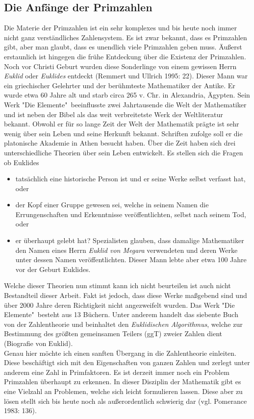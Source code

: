 \documentclass[german,12pt,a4paper]{article}
\begin{document}
\subsection{Die Anfänge der Primzahlen}
Die Materie der Primzahlen ist ein sehr komplexes und bis heute noch immer nicht ganz verständliches Zahlensystem. Es ist zwar bekannt, dass es Primzahlen gibt, aber man glaubt, dass es unendlich viele Primzahlen geben muss. Äußerst erstaunlich ist hingegen die frühe Entdeckung über die Existenz der Primzahlen. Noch vor Christi Geburt wurden diese Sonderlinge von einem gewissen Herrn \textit{Euklid} oder \textit{Euklides} entdeckt (Remmert und Ullrich 1995: 22). Dieser Mann war ein griechischer Gelehrter und der berühmteste Mathematiker der Antike. Er wurde etwa 60 Jahre alt und starb circa 265 v. Chr. in Alexandria, Ägypten. Sein Werk "Die Elemente"\ beeinflusste zwei Jahrtausende die Welt der Mathematiker und ist neben der Bibel als das weit verbreitetste Werk der Weltliteratur bekannt. Obwohl er für so lange Zeit der Welt der Mathematik prägte ist sehr wenig über sein Leben und seine Herkunft bekannt. Schriften zufolge soll er die platonische Akademie in Athen besucht haben. Über die Zeit haben sich drei unterschiedliche Theorien über sein Leben entwickelt. Es stellen sich die Fragen ob Euklides\
\begin{itemize}
\item tatsächlich eine historische Person ist und er seine Werke selbst verfasst hat, oder
\item der Kopf einer Gruppe gewesen sei, welche in seinem Namen die Errungenschaften und Erkenntnisse veröffentlichten, selbst nach seinem Tod, oder
\item er überhaupt gelebt hat? Spezialisten glauben, dass damalige Mathematiker den Namen eines Herrn \textit{Euklid von Megara} verwendeten und deren Werke unter dessen Namen veröffentlichten. Dieser Mann lebte aber etwa 100 Jahre vor der Geburt Euklides.
\end{itemize}
Welche dieser Theorien nun stimmt kann ich nicht beurteilen ist auch nicht Bestandteil dieser Arbeit. Fakt ist jedoch, dass diese Werke maßgebend sind und über 2000 Jahre deren Richtigkeit nicht angezweifelt wurden. Das Werk  "Die Elemente"\ besteht aus 13 Büchern. Unter anderem handelt das siebente Buch von der Zahlentheorie und beinhaltet den \textit{Euklidischen Algorithmus}, welche zur Bestimmung des größten gemeinsamen Teilers (ggT) zweier Zahlen dient (Biografie von Euklid).\\
Genau hier möchte ich einen sanften Übergang in die Zahlentheorie einleiten. Diese beschäftigt sich mit den Eigenschaften von ganzen Zahlen und zerlegt unter anderem eine Zahl in Primfaktoren. Es ist derzeit immer noch ein Problem Primzahlen überhaupt zu erkennen. In dieser Disziplin der Mathematik gibt es eine Vielzahl an Problemen, welche sich leicht formulieren lassen. Diese aber zu lösen stellt sich bis heute noch als außerordentlich schwierig dar (vgl. Pomerance 1983: 136).
\end{document}
